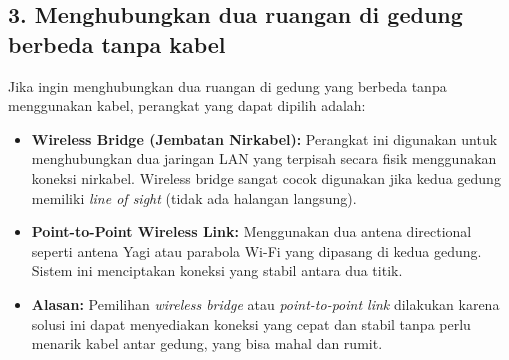 \subsection*{3. Menghubungkan dua ruangan di gedung berbeda tanpa kabel}

Jika ingin menghubungkan dua ruangan di gedung yang berbeda tanpa menggunakan kabel, perangkat yang dapat dipilih adalah:

\begin{itemize}
    \item \textbf{Wireless Bridge (Jembatan Nirkabel):} Perangkat ini digunakan untuk menghubungkan dua jaringan LAN yang terpisah secara fisik menggunakan koneksi nirkabel. Wireless bridge sangat cocok digunakan jika kedua gedung memiliki \textit{line of sight} (tidak ada halangan langsung).
    
    \item \textbf{Point-to-Point Wireless Link:} Menggunakan dua antena directional seperti antena Yagi atau parabola Wi-Fi yang dipasang di kedua gedung. Sistem ini menciptakan koneksi yang stabil antara dua titik.
    
    \item \textbf{Alasan:} Pemilihan \textit{wireless bridge} atau \textit{point-to-point link} dilakukan karena solusi ini dapat menyediakan koneksi yang cepat dan stabil tanpa perlu menarik kabel antar gedung, yang bisa mahal dan rumit.
\end{itemize}



